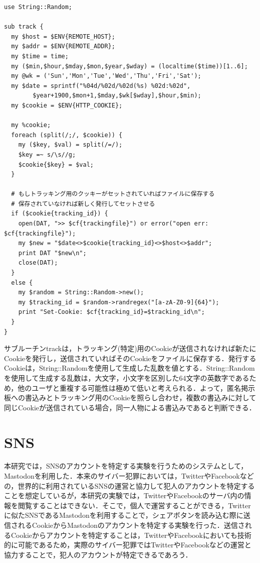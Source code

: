 \documentclass[10pt, a4paper]{jreport}
\begin{document}
\begin{lstlisting}[caption=同一ユーザ特定機能,label=track]
use String::Random;

sub track {
  my $host = $ENV{REMOTE_HOST};
  my $addr = $ENV{REMOTE_ADDR};
  my $time = time;
  my ($min,$hour,$mday,$mon,$year,$wday) = (localtime($time))[1..6];
  my @wk = ('Sun','Mon','Tue','Wed','Thu','Fri','Sat');
  my $date = sprintf("%04d/%02d/%02d(%s) %02d:%02d",
        $year+1900,$mon+1,$mday,$wk[$wday],$hour,$min);
  my $cookie = $ENV{HTTP_COOKIE};

  my %cookie;
  foreach (split(/;/, $cookie)) {
    my ($key, $val) = split(/=/);
    $key =~ s/\s//g;
    $cookie{$key} = $val;
  }

  # もしトラッキング用のクッキーがセットされていればファイルに保存する
  # 保存されていなければ新しく発行してセットさせる
  if ($cookie{tracking_id}) {
    open(DAT, ">> $cf{trackingfile}") or error("open err: $cf{trackingfile}");
    my $new = "$date<>$cookie{tracking_id}<>$host<>$addr";
    print DAT "$new\n";
    close(DAT);
  }
  else {
    my $random = String::Random->new();
    my $tracking_id = $random->randregex("[a-zA-Z0-9]{64}");
    print "Set-Cookie: $cf{tracking_id}=$tracking_id\n";
  }
}
\end{lstlisting}

サブルーチンtrackは，トラッキング(特定)用のCookieが送信されなければ新たにCookieを発行し，送信されていればそのCookieをファイルに保存する．発行するCookieは，String::Randomを使用して生成した乱数を値とする．String::Randomを使用して生成する乱数は，大文字，小文字を区別した64文字の英数字であるため，他のユーザと重複する可能性は極めて低いと考えられる．よって，匿名掲示板への書込みとトラッキング用のCookieを照らし合わせ，複数の書込みに対して同じCookieが送信されている場合，同一人物による書込みであると判断できる．

\section{SNS}\label{sec: sns}
本研究では，SNSのアカウントを特定する実験を行うためのシステムとして，Mastodonを利用した．本来のサイバー犯罪においては，TwitterやFacebookなどの，世界的に利用されているSNSの運営と協力して犯人のアカウントを特定することを想定しているが，本研究の実験では，TwitterやFacebookのサーバ内の情報を閲覧することはできない．そこで，個人で運営することができる，Twitterに似たSNSであるMastodonを利用することで，シェアボタンを読み込む際に送信されるCookieからMastodonのアカウントを特定する実験を行った．送信されるCookieからアカウントを特定することは，TwitterやFacebookにおいても技術的に可能であるため，実際のサイバー犯罪ではTwitterやFacebookなどの運営と協力することで，犯人のアカウントが特定できるであろう．
\end{document}
